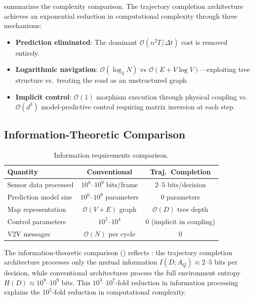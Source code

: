 \documentclass[twocolumn,10pt]{article}
\theoremstyle{definition}
\newcommand{\BigO}{\mathcal{O}}
\begin{document}
 summarizes the complexity comparison. The trajectory completion architecture achieves an exponential reduction in computational complexity through three mechanisms:
\begin{itemize}[leftmargin=*]
\item \textbf{Prediction eliminated}: The dominant $\BigO(n^2 T/\Delta t)$ cost is removed entirely.
\item \textbf{Logarithmic navigation}: $\BigO(\log_3 N)$ vs $\BigO(E + V \log V)$---exploiting tree structure vs.\ treating the road as an unstructured graph.
\item \textbf{Implicit control}: $\BigO(1)$ morphism execution through physical coupling vs.\ $\BigO(d^3)$ model-predictive control requiring matrix inversion at each step.
\end{itemize}

\subsection{Information-Theoretic Comparison}

\begin{table}[t]
\centering
\caption{Information requirements comparison.}
\label{tab:information}
\small
\begin{tabular}{@{}lcc@{}}
\toprule
\textbf{Quantity} & \textbf{Conventional} & \textbf{Traj.\ Completion} \\
\midrule
Sensor data processed & $10^8$--$10^9$ bits/frame & $2$--$5$ bits/decision \\
Prediction model size & $10^6$--$10^9$ parameters & 0 parameters \\
Map representation & $\BigO(V + E)$ graph & $\BigO(D)$ tree depth \\
Control parameters & $10^2$--$10^4$ & 0 (implicit in coupling) \\
V2V messages & $\BigO(N)$ per cycle & 0 \\
\bottomrule
\end{tabular}
\end{table}

The information-theoretic comparison () reflects : the trajectory completion architecture processes only the mutual information $I(D; A_Q) \approx 2$--$5$ bits per decision, while conventional architectures process the full environment entropy $H(D) \approx 10^8$--$10^9$ bits. This $10^3$--$10^7$-fold reduction in information processing explains the $10^5$-fold reduction in computational complexity.
\end{document}
